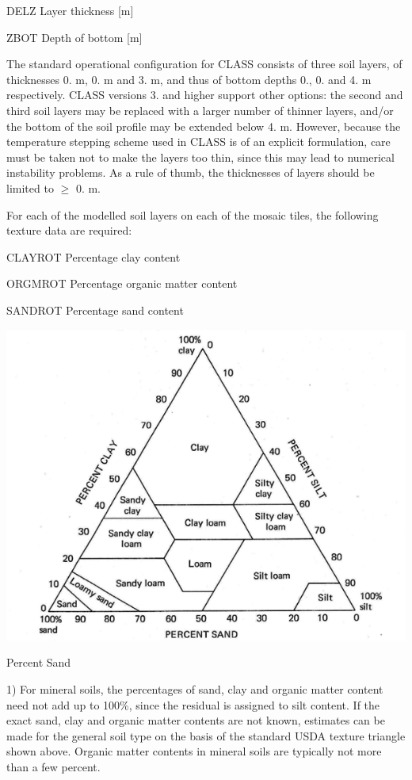 \begin{DoxyItemize}
\item D\+E\+L\+Z Layer thickness \mbox{[}m\mbox{]}
\item Z\+B\+O\+T Depth of bottom \mbox{[}m\mbox{]}
\end{DoxyItemize}

The standard operational configuration for C\+L\+A\+S\+S consists of three soil layers, of thicknesses 0. m, 0. m and 3. m, and thus of bottom depths 0., 0. and 4. m respectively. C\+L\+A\+S\+S versions 3. and higher support other options\+: the second and third soil layers may be replaced with a larger number of thinner layers, and/or the bottom of the soil profile may be extended below 4. m. However, because the temperature stepping scheme used in C\+L\+A\+S\+S is of an explicit formulation, care must be taken not to make the layers too thin, since this may lead to numerical instability problems. As a rule of thumb, the thicknesses of layers should be limited to $\geq$ 0. m.

For each of the modelled soil layers on each of the mosaic tiles, the following texture data are required\+:


\begin{DoxyItemize}
\item C\+L\+A\+Y\+R\+O\+T Percentage clay content
\item O\+R\+G\+M\+R\+O\+T Percentage organic matter content
\item S\+A\+N\+D\+R\+O\+T Percentage sand content
\end{DoxyItemize}


\begin{DoxyImage}
\includegraphics[width=\textwidth,height=\textheight/2,keepaspectratio=true]{percentSand.png}
\caption{Percent Sand}
\end{DoxyImage}
 1) For mineral soils, the percentages of sand, clay and organic matter content need not add up to 100\%, since the residual is assigned to silt content. If the exact sand, clay and organic matter contents are not known, estimates can be made for the general soil type on the basis of the standard U\+S\+D\+A texture triangle shown above. Organic matter contents in mineral soils are typically not more than a few percent.

